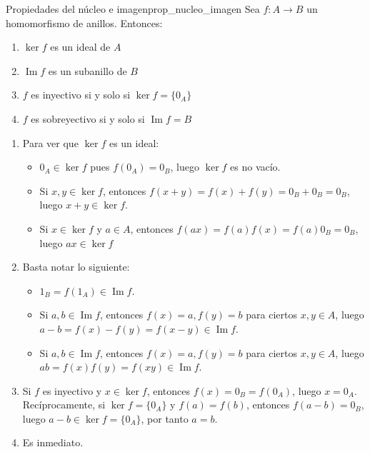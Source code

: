 \begin{proposition}{Propiedades del núcleo e imagen}{prop_nucleo_imagen}
    Sea \(f: A \to B\) un homomorfismo de anillos. Entonces:
    \begin{enumerate}
        \item \(\ker f\) es un ideal de \(A\)
        \item \(\operatorname{Im} f\) es un subanillo de \(B\)
        \item \(f\) es inyectivo si y solo si \(\ker f = \{0_A\}\)
        \item \(f\) es sobreyectivo si y solo si \(\operatorname{Im} f = B\)
    \end{enumerate}
\end{proposition}

\begin{proofbox}
    \begin{enumerate}
        \item Para ver que \(\ker f\) es un ideal:
        \begin{itemize}
            \item \(0_A \in \ker f\) pues \(f(0_A) = 0_B\), luego $\ker f$ es no vacío.
            \item Si \(x, y \in \ker f\), entonces \(f(x + y) = f(x) + f(y) = 0_B + 0_B = 0_B\), luego \(x + y \in \ker f\).
            \item Si \(x \in \ker f\) y \(a \in A\), entonces \(f(ax) = f(a)f(x) = f(a) 0_B = 0_B\), luego \(ax \in \ker f\)
        \end{itemize}
        
        \item Basta notar lo siguiente:
        \begin{itemize}
            \item \(1_B = f(1_A) \in \operatorname{Im} f\).
            \item Si \(a, b \in \operatorname{Im} f\), entonces \(f(x) = a, f(y) = b\) para ciertos $x,y \in A$, luego \(a - b = f(x) - f(y) = f(x - y) \in \operatorname{Im} f\).
            \item Si \(a, b \in \operatorname{Im} f\), entonces \(f(x) = a, f(y) = b\) para ciertos $x,y \in A$, luego \(ab = f(x)f(y) = f(xy) \in \operatorname{Im} f\).
        \end{itemize}

        \item Si \(f\) es inyectivo y \(x \in \ker f\), entonces \(f(x) = 0_B = f(0_A)\), luego \(x = 0_A\). Recíprocamente, si \(\ker f = \{0_A\}\) y \(f(a) = f(b)\), entonces \(f(a - b) = 0_B\), luego \(a - b \in \ker f = \{0_A\}\), por tanto \(a = b\).

        \item Es inmediato.
    \end{enumerate}
\end{proofbox}

